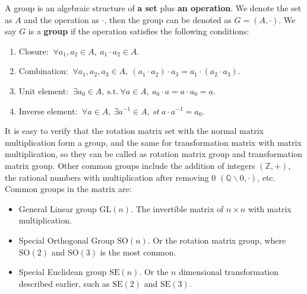 A group is an algebraic structure of \textbf{a set} plus \textbf{an operation}. We denote the set as $A$ and the operation as $\cdot$, then the group can be denoted as $G=(A,\cdot)$. We say $G$ is a \textbf{group} if the operation satisfies the following conditions:

\begin{enumerate}
    \item { {Closure}}: $ \  \forall a_1, a_2 \in A, \  a_1 \cdot a_2 \in A$.
    \item { {Combination}}: $ \  \forall a_1, a_2, a_3 \in A, \  (a_1 \cdot a_2) \cdot a_3 = a_1 \cdot ( a_2 \cdot a_3) $.
    \item { {Unit element}}: $ \  \exists a_0 \in A, \  \mathrm{s.t.} \ \forall a \in A, \  a_0 \cdot a = a \cdot a_0 = a $.
    \item { {Inverse element}}: $ \  \forall a \in A, \  \exists a^{-1} \in A, \  st \  a \cdot a^{-1} = a_0 $.
\end{enumerate}

It is easy to verify that the rotation matrix set with the normal matrix multiplication form a group, and the same for transformation matrix with matrix multiplication, so they can be called as rotation matrix group and transformation matrix group. Other common groups include the addition of integers $(\mathbb{Z}, +)$, the rational numbers with multiplication after removing 0 $(\mathbb{Q}\backslash 0, \cdot )$, etc. Common groups in the matrix are:

\begin{itemize}
    \item {General Linear group $\mathrm{GL}(n)$}. The invertible matrix of $n \times n$ with matrix multiplication.
    \item {Special Orthogonal Group $\mathrm{SO}(n)$}. Or the rotation matrix group, where $\mathrm{SO}(2)$ and $\mathrm{SO}(3) $ is the most common.
    \item {Special Euclidean group $\mathrm{SE}(n)$}. Or the $n$ dimensional transformation described earlier, such as $\mathrm{SE}(2)$ and $\mathrm{SE}(3)$.
\end{itemize}

